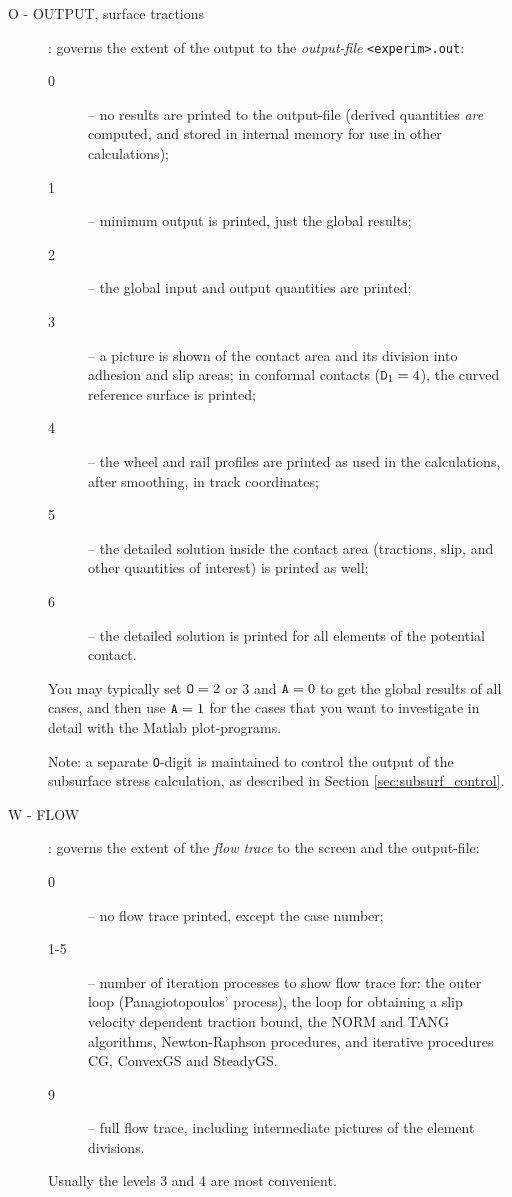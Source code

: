 \documentclass[12pt]{report}
\begin{document}
\begin{description}
\item[O - OUTPUT, surface tractions] \label{o-digit} : governs the extent
        of the output to the {\em output-file\/} {\tt <experim>\-.out}:
\begin{description}
\item[0] -- no results are printed to the output-file (derived quantities
        {\em are\/} computed, and stored in internal memory for use in
        other calculations);
\item[1] -- minimum output is printed, just the global results;
\item[2] -- the global input and output quantities are printed;
\item[3] -- a picture is shown of the contact area and its division into
        adhesion and slip areas; in conformal contacts (${\tt D}_1=4$),
        the curved reference surface is printed;
\item[4] -- the wheel and rail profiles are printed as used in the
        calculations, after smoothing, in track coordinates;
\item[5] -- the detailed solution inside the contact area (tractions, slip,
        and other quantities of interest) is printed as well;
\item[6] -- the detailed solution is printed for all elements of the
        potential contact.
\end{description}
You may typically set ${\tt O}=2$ or 3 and ${\tt A}=0$ to get the global
results of all cases, and then use ${\tt A}=1$ for the cases that you want to
investigate in detail with the Matlab plot-programs.

Note: a separate {\tt O}-digit is maintained to control the output
of the subsurface stress calculation, as described in Section
\ref{sec:subsurf_control}.

\item[W - FLOW] \label{w-digit} : governs the extent of the {\em flow
        trace\/} to the screen and the output-file:
\begin{description}
\item[0] -- no flow trace printed, except the case number;
\item[1-5] -- number of iteration processes to show flow trace for: the
        outer loop (Panagiotopoulos' process), the loop for obtaining a
        slip velocity dependent traction bound, the NORM and
        TANG algorithms, New\-ton-Raph\-son procedures, and iterative
        procedures CG, ConvexGS and SteadyGS.
\item[9] -- full flow trace, including intermediate pictures of the element
        divisions.
\end{description}
Usually the levels 3 and 4 are most convenient.


\end{description}
\end{document}
